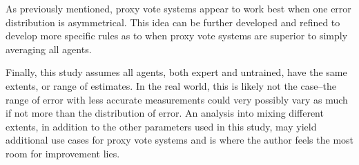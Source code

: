 As previously mentioned, proxy vote systems appear to work best when one error
distribution is asymmetrical.
This idea can be further developed and refined to develop more specific rules as to
when proxy vote systems are superior to simply averaging all agents.

Finally, this study assumes all agents, both expert and untrained, have the same
extents, or range of estimates.
In the real world, this is likely not the case--the range of error with less accurate
measurements could very possibly vary as much if not more than the distribution of
error.
An analysis into mixing different extents, in addition to the other parameters used
in this study, may yield additional use cases for proxy vote systems and is where the
author feels the most room for improvement lies.
